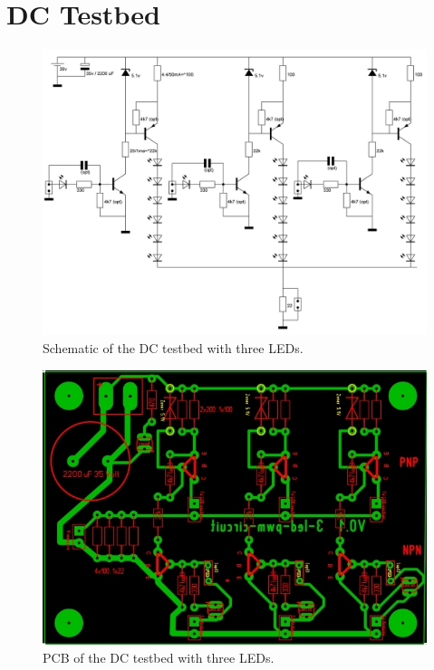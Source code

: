 
\chapter{DC Testbed}
\label{app:dc-testbed}

	\begin{figure}
		\centering
		\includegraphics[width=\textwidth]{chapters/3-led-pwm-circuit-v2.jpg}
		\caption{Schematic of the DC testbed with three LEDs.}
		\label{fig:dc-testbed-schematic}
	\end{figure}

	\begin{figure}
		\centering
		\includegraphics[width=\textwidth]{chapters/3-led-pwm-circuit-v2-pcb.jpg}
		\caption{PCB of the DC testbed with three LEDs.}
		\label{fig:dc-testbed-pvb}
	\end{figure}



	